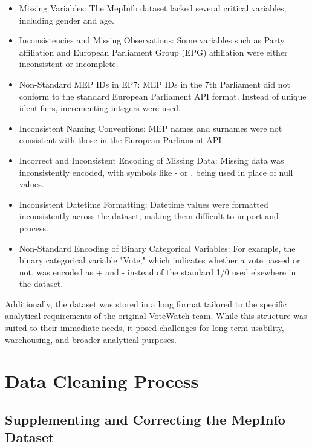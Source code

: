 \documentclass{article}
\begin{document}
\begin{itemize}
   \item Missing Variables: The MepInfo dataset lacked several critical variables, including gender and age.
   \item Inconsistencies and Missing Observations: Some variables such as Party affiliation and European Parliament Group (EPG) affiliation were either inconsistent or incomplete.
   \item Non-Standard MEP IDs in EP7: MEP IDs in the 7th Parliament did not conform to the standard European Parliament API format. Instead of unique identifiers, incrementing integers were used.
   \item Inconsistent Naming Conventions: MEP names and surnames were not consistent with those in the European Parliament API.
   \item Incorrect and Inconsistent Encoding of Missing Data: Missing data was inconsistently encoded, with symbols like  -  or  .  being used in place of null values.
   \item Inconsistent Datetime Formatting: Datetime values were formatted inconsistently across the dataset, making them difficult to import and process.
   \item Non-Standard Encoding of Binary Categorical Variables: For example, the binary categorical variable "Vote," which indicates whether a vote passed or not, was encoded as  +  and  -  instead of the standard 1/0 used elsewhere in the dataset.
 \end{itemize}
Additionally, the dataset was stored in a long format tailored to the specific analytical requirements of the original VoteWatch team. While this structure was suited to their immediate needs, it posed challenges for long-term usability, warehousing, and broader analytical purposes.

\section{Data Cleaning Process}

\subsection{Supplementing and Correcting the MepInfo Dataset}
\end{document}
